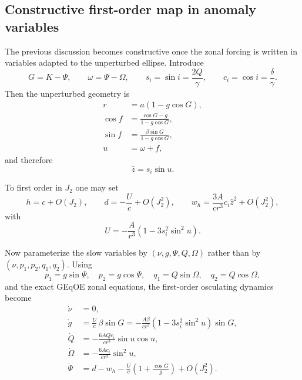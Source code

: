 \documentclass[11pt]{article}
\begin{document}
\subsection{Constructive first-order map in anomaly variables}

The previous discussion becomes constructive once the zonal forcing is written
in variables adapted to the unperturbed ellipse. Introduce
\begin{equation}
G = K - \Psi,
\qquad
\omega = \Psi - \Omega,
\qquad
s_i = \sin i = \frac{2Q}{\gamma},
\qquad
c_i = \cos i = \frac{\delta}{\gamma}.
\end{equation}
Then the unperturbed geometry is
\begin{align}
r &= a(1-g\cos G), \\
\cos f &= \frac{\cos G - g}{1-g\cos G}, \\
\sin f &= \frac{\beta \sin G}{1-g\cos G}, \\
u &= \omega + f,
\end{align}
and therefore
\begin{equation}
\hat z = s_i \sin u.
\end{equation}

To first order in $J_2$ one may set
\begin{equation}
h = c + O(J_2),
\qquad
d = -\frac{U}{c} + O(J_2^2),
\qquad
w_h = \frac{3A}{c r^3} c_i \hat z^2 + O(J_2^2),
\end{equation}
with
\begin{equation}
U = -\frac{A}{r^3}\left(1-3s_i^2\sin^2 u\right).
\end{equation}

Now parameterize the slow variables by $(\nu,g,\Psi,Q,\Omega)$ rather than by
$(\nu,p_1,p_2,q_1,q_2)$. Using
\begin{equation}
p_1 = g\sin\Psi,
\quad
p_2 = g\cos\Psi,
\quad
q_1 = Q\sin\Omega,
\quad
q_2 = Q\cos\Omega,
\end{equation}
and the exact GEqOE zonal equations, the first-order osculating dynamics become
\begin{align}
\dot \nu &= 0, \\
\dot g &=
\frac{U}{c}\,\beta \sin G
= -\frac{A\beta}{c r^3}
\left(1-3s_i^2\sin^2 u\right)\sin G,
\label{eq:gdot_j2_first}\\
\dot Q &=
-\frac{6A Q c_i}{c r^3}\sin u \cos u,
\label{eq:Qdot_j2_first}\\
\dot\Omega &=
-\frac{6A c_i}{c r^3}\sin^2 u,
\label{eq:Omegadot_j2_first}\\
\dot\Psi &=
d - w_h - \frac{U}{c}\left(1 + \frac{\cos G}{g}\right)
+ O(J_2^2).
\label{eq:Psidot_j2_first}
\end{align}
\end{document}
